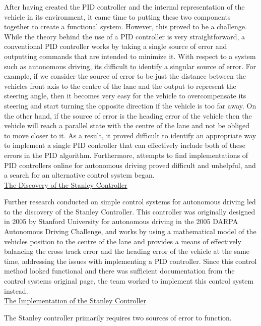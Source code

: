 \documentclass[titlepage,draft]{article}
\begin{document}
{After having created the PID controller and the internal representation of the vehicle in its environment, it came time to putting these two components together to create a functional system. However, this proved to be a challenge. While the theory behind the use of a PID controller is very straightforward, a conventional PID controller works by taking a single source of error and outputting commands that are intended to minimize it. With respect to a system such as autonomous driving, its difficult to identify a singular source of error. For example, if we consider the source of error to be just the distance between the vehicles front axis to the centre of the lane and the output to represent the steering angle, then it becomes very easy for the vehicle to overcompensate its steering and start turning the opposite direction if the vehicle is too far away. On the other hand, if the source of error is the heading error of the vehicle then the vehicle will reach a parallel state with the centre of the lane and not be obliged to move closer to it. As a result, it proved difficult to identify an appropriate way to implement a single PID controller that can effectively include both of these errors in the PID algorithm. Furthermore, attempts to find implementations of PID controllers online for autonomous driving proved difficult and unhelpful, and a search for an alternative control system began.
\\

\underline{The Discovery of the Stanley Controller}

Further research conducted on simple control systems for autonomous driving led to the discovery of the Stanley Controller. This controller was originally designed in 2005 by Stanford University for autonomous driving in the 2005 DARPA Autonomous Driving Challenge, and works by using a mathematical model of the vehicles position to the centre of the lane and provides a means of effectively balancing the cross track error and the heading error of the vehicle at the same time, addressing the issues with implementing a PID controller. Since this control method looked functional and there was sufficient documentation from the control systems original page, the team worked to implement this control system instead.
\\

\underline{The Implementation of the Stanley Controller}

The Stanley controller primarily requires two sources of error to function.

}
\end{document}
